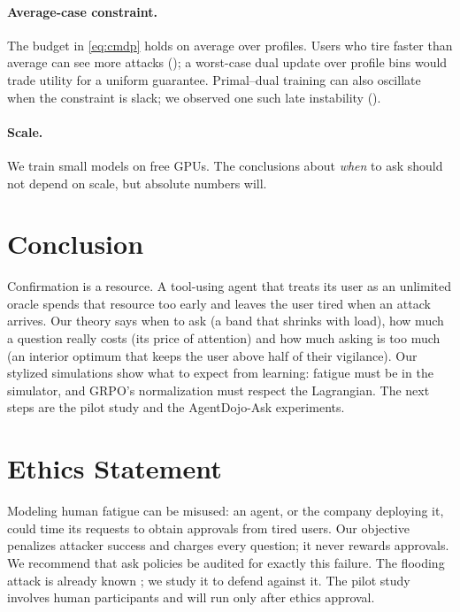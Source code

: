 \documentclass[10pt]{article}
\newcommand{\ADA}{AgentDojo-Ask\xspace}
\theoremstyle{plain}
\theoremstyle{definition}
\begin{document}
\paragraph{Average-case constraint.} The budget in \eqref{eq:cmdp} holds on average over profiles. Users who tire faster than average can see more attacks (); a worst-case dual update over profile bins would trade utility for a uniform guarantee. Primal--dual training can also oscillate when the constraint is slack; we observed one such late instability ().

\paragraph{Scale.} We train small models on free GPUs. The conclusions about \emph{when} to ask should not depend on scale, but absolute numbers will.

\section{Conclusion}\label{sec:conclusion}

Confirmation is a resource. A tool-using agent that treats its user as an unlimited oracle spends that resource too early and leaves the user tired when an attack arrives. Our theory says when to ask (a band that shrinks with load), how much a question really costs (its price of attention) and how much asking is too much (an interior optimum that keeps the user above half of their vigilance). Our stylized simulations show what to expect from learning: fatigue must be in the simulator, and GRPO's normalization must respect the Lagrangian. The next steps are the pilot study and the \ADA experiments.

\section*{Ethics Statement}
Modeling human fatigue can be misused: an agent, or the company deploying it, could time its requests to obtain approvals from tired users. Our objective penalizes attacker success and charges every question; it never rewards approvals. We recommend that ask policies be audited for exactly this failure. The flooding attack is already known \citep{turan2026oversight}; we study it to defend against it. The pilot study involves human participants and will run only after ethics approval.
\end{document}
